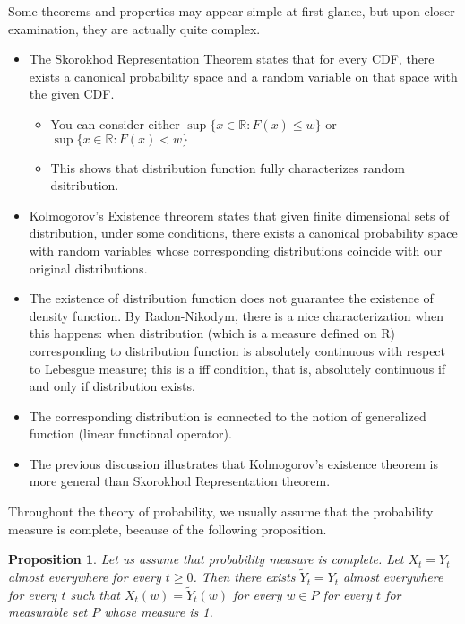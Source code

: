 \documentclass[11pt,reqno]{amsart}
\newtheorem{proposition}[theorem]{Proposition}
\theoremstyle{remark}
\begin{document}
Some theorems and properties may appear simple at first glance, but upon closer examination, they are actually quite complex.
\begin{itemize}
\item The Skorokhod Representation Theorem states that for every CDF, there 
exists a canonical probability space and a random variable on that space with 
the given CDF.
\begin{itemize}
\item You can consider either $\sup\{x\in \mathbb{R}:F(x)\leq w\}$ or $\sup\{x\in\mathbb{R}:F(x)<w\}$
\item This shows that distribution function fully characterizes random dsitribution.
\end{itemize}
\item Kolmogorov's Existence threorem states that given finite dimensional sets of distribution, under some conditions, there exists a canonical probability space with random variables whose 
corresponding distributions coincide with our original distributions.
\item The existence of distribution function does not guarantee the 
existence of density function. By Radon-Nikodym, there is a nice characterization 
when this happens: when distribution (which is a measure defined on R) corresponding 
to distribution function is absolutely continuous with respect to Lebesgue 
measure; this is a iff condition, that is, absolutely continuous if and only 
if distribution exists.
\item The corresponding distribution is connected to the notion of generalized function (linear functional operator).
\item The previous discussion illustrates that Kolmogorov's existence theorem is more general than Skorokhod Representation theorem.
\end{itemize}
Throughout the theory of probability, we usually assume that the probability measure is complete, because of the following proposition.
\begin{proposition}
Let us assume that probability measure is complete. Let $X_t=Y_t$ almost everywhere for every $t\geq 0$.
Then there exists $\tilde{Y}_t=Y_t$ almost everywhere for every $t$ such that $X_t(w)=\tilde{Y}_t(w)$ for every $w\in P$ for every $t$ for 
measurable set $P$ whose measure is 1.
\end{proposition}
\end{document}
